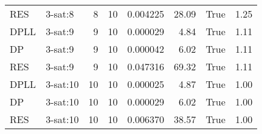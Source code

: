 \begin{tabular}{llrrrrlr}
 RES         & 3-sat:8     &           8 &        10 &   0.004225 &         28.09 & True     &    1.25 \\
 DPLL        & 3-sat:9     &           9 &        10 &   0.000029 &          4.84 & True     &    1.11 \\
 DP          & 3-sat:9     &           9 &        10 &   0.000042 &          6.02 & True     &    1.11 \\
 RES         & 3-sat:9     &           9 &        10 &   0.047316 &         69.32 & True     &    1.11 \\
 DPLL        & 3-sat:10    &          10 &        10 &   0.000025 &          4.87 & True     &    1.00 \\
 DP          & 3-sat:10    &          10 &        10 &   0.000029 &          6.02 & True     &    1.00 \\
 RES         & 3-sat:10    &          10 &        10 &   0.006370 &         38.57 & True     &    1.00 \\
\bottomrule
\end{tabular}